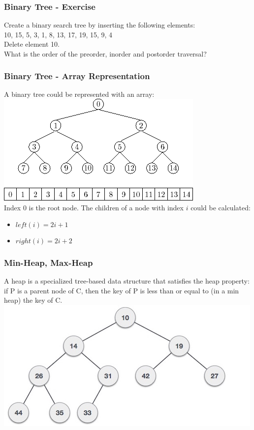 \begin{frame}[fragile]
\frametitle{Binary Tree - Exercise}
\begin{exercise}
Create a binary search tree by inserting the following elements:\\
10, 15, 5, 3, 1, 8, 13, 17, 19, 15, 9, 4\\
Delete element 10.\\
What is the order of the preorder, inorder and postorder traversal?
\end{exercise}
\end{frame}

\begin{frame}[fragile]
\frametitle{Binary Tree - Array Representation}
A binary tree could be represented with an array:
\vspace{1mm}
\includegraphics[scale=0.4]{img/img1156.png}\\
\vspace{1mm}
Index 0 is the root node. The children of a node with index $i$ could be calculated:
\begin{itemize}
\item $left(i) = 2i + 1$
\item $right(i) = 2i + 2$
\end{itemize}
\end{frame}

\begin{frame}[fragile]
\frametitle{Min-Heap, Max-Heap}
A heap is a specialized tree-based data structure that satisfies the heap property: if P is a parent node of C, then the key of P is less than or equal to (in a min heap) the key of C.\\
\vspace{1mm}
\includegraphics[scale=0.4]{img/min_heap.jpg}\\
\end{frame}

